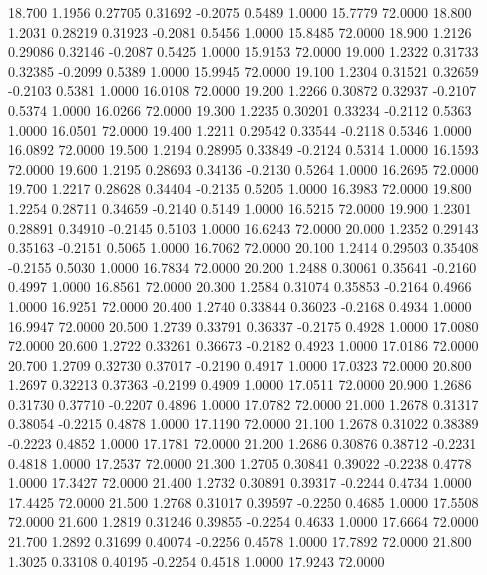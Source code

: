   18.700   1.1956   0.27705   0.31692  -0.2075   0.5489   1.0000  15.7779  72.0000
  18.800   1.2031   0.28219   0.31923  -0.2081   0.5456   1.0000  15.8485  72.0000
  18.900   1.2126   0.29086   0.32146  -0.2087   0.5425   1.0000  15.9153  72.0000
  19.000   1.2322   0.31733   0.32385  -0.2099   0.5389   1.0000  15.9945  72.0000
  19.100   1.2304   0.31521   0.32659  -0.2103   0.5381   1.0000  16.0108  72.0000
  19.200   1.2266   0.30872   0.32937  -0.2107   0.5374   1.0000  16.0266  72.0000
  19.300   1.2235   0.30201   0.33234  -0.2112   0.5363   1.0000  16.0501  72.0000
  19.400   1.2211   0.29542   0.33544  -0.2118   0.5346   1.0000  16.0892  72.0000
  19.500   1.2194   0.28995   0.33849  -0.2124   0.5314   1.0000  16.1593  72.0000
  19.600   1.2195   0.28693   0.34136  -0.2130   0.5264   1.0000  16.2695  72.0000
  19.700   1.2217   0.28628   0.34404  -0.2135   0.5205   1.0000  16.3983  72.0000
  19.800   1.2254   0.28711   0.34659  -0.2140   0.5149   1.0000  16.5215  72.0000
  19.900   1.2301   0.28891   0.34910  -0.2145   0.5103   1.0000  16.6243  72.0000
  20.000   1.2352   0.29143   0.35163  -0.2151   0.5065   1.0000  16.7062  72.0000
  20.100   1.2414   0.29503   0.35408  -0.2155   0.5030   1.0000  16.7834  72.0000
  20.200   1.2488   0.30061   0.35641  -0.2160   0.4997   1.0000  16.8561  72.0000
  20.300   1.2584   0.31074   0.35853  -0.2164   0.4966   1.0000  16.9251  72.0000
  20.400   1.2740   0.33844   0.36023  -0.2168   0.4934   1.0000  16.9947  72.0000
  20.500   1.2739   0.33791   0.36337  -0.2175   0.4928   1.0000  17.0080  72.0000
  20.600   1.2722   0.33261   0.36673  -0.2182   0.4923   1.0000  17.0186  72.0000
  20.700   1.2709   0.32730   0.37017  -0.2190   0.4917   1.0000  17.0323  72.0000
  20.800   1.2697   0.32213   0.37363  -0.2199   0.4909   1.0000  17.0511  72.0000
  20.900   1.2686   0.31730   0.37710  -0.2207   0.4896   1.0000  17.0782  72.0000
  21.000   1.2678   0.31317   0.38054  -0.2215   0.4878   1.0000  17.1190  72.0000
  21.100   1.2678   0.31022   0.38389  -0.2223   0.4852   1.0000  17.1781  72.0000
  21.200   1.2686   0.30876   0.38712  -0.2231   0.4818   1.0000  17.2537  72.0000
  21.300   1.2705   0.30841   0.39022  -0.2238   0.4778   1.0000  17.3427  72.0000
  21.400   1.2732   0.30891   0.39317  -0.2244   0.4734   1.0000  17.4425  72.0000
  21.500   1.2768   0.31017   0.39597  -0.2250   0.4685   1.0000  17.5508  72.0000
  21.600   1.2819   0.31246   0.39855  -0.2254   0.4633   1.0000  17.6664  72.0000
  21.700   1.2892   0.31699   0.40074  -0.2256   0.4578   1.0000  17.7892  72.0000
  21.800   1.3025   0.33108   0.40195  -0.2254   0.4518   1.0000  17.9243  72.0000
